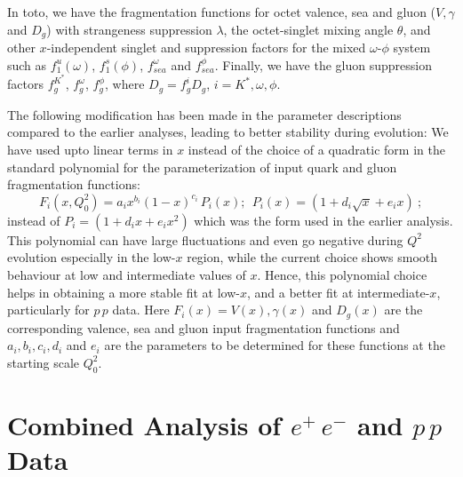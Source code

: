 \documentclass{ws-ijmpa}
\def\lm{{\lambda}}
\def\tta{{\theta}}
\def\om{{\omega}}
\def\ph{{\phi}}
\begin{document}
In toto, we have the fragmentation functions for octet valence, sea and
gluon ($V,\gamma$ and $D_g$) with strangeness suppression $\lm$, the
octet-singlet mixing angle $\tta$, and other $x$-independent singlet and 
suppression factors for the mixed $\omega$-$\phi$ system such as 
$f_1^u({\om})$, $f_1^s({\ph})$, $f_{sea}^{\om}$ and $f_{sea}^{\ph}$.  
Finally, we have the gluon suppression factors $f_g^{K^*}$, $f_g^{\om}$, 
$f_g^{\ph}$\cite{Savinlo}, where $D_g  = f_g^i D_g$, $i = K^*, \omega, \phi$.

The following modification has been made in the parameter descriptions compared to
the earlier analyses, leading to better stability during evolution:
We have used upto linear terms in $x$ instead of the choice of
a quadratic form in the standard polynomial\cite{Reya} for the
parameterization of input quark and gluon fragmentation functions:
\begin{equation}
F_i(x,Q_0^2) = a_i  x^{b_i}(1-x)^{c_i}\, P_i(x);
~~P_i(x) = (1 + d_i \sqrt x + e_i x)~;
\label{eq:func}
\end{equation}
instead of $P_i = (1 + d_i x + e_i x^2)$ which was the form used in the
earlier analysis. This polynomial can have large fluctuations and even
go negative during $Q^2$ evolution especially in the low-$x$ region,
while the current choice shows smooth behaviour at low and intermediate
values of $x$. Hence, this polynomial choice helps in obtaining a more
stable fit at low-$x$, and a better fit at intermediate-$x$, particularly
for $p\,p$ data.  Here $F_i(x) = V(x), \gamma(x)$ and $D_g(x)$ are the
corresponding valence, sea and gluon input fragmentation functions and
$a_i, b_i, c_i, d_i$ and $e_i$ are the parameters to be determined for
these functions at the starting scale $Q_0^2$.


\section{Combined Analysis of $e^+\,e^-$ and $p\,p$ Data }
\label{Fit}
\end{document}
